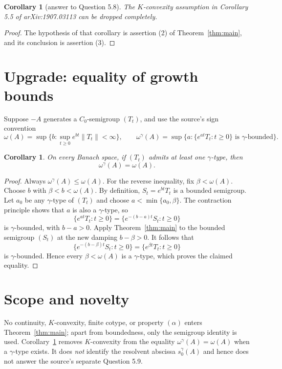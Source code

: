 \documentclass[11pt]{article}
\newtheorem{corollary}[theorem]{Corollary}
\begin{document}
\begin{corollary}[answer to Question 5.8]
The $K$-convexity assumption in Corollary 5.5 of arXiv:1907.03113 can be
dropped completely.
\end{corollary}

\begin{proof}
The hypothesis of that corollary is assertion (2) of
Theorem~\ref{thm:main}, and its conclusion is assertion (3).
\end{proof}

\section{Upgrade: equality of growth bounds}

Suppose $-A$ generates a $C_0$-semigroup $(T_t)$, and use the source's sign
convention
\[
 \omega(A)=\sup\{b:\sup_{t\geq0}e^{bt}\|T_t\|<\infty\},
 \qquad
 \omega^\gamma(A)=\sup\{a:\{e^{at}T_t:t\geq0\}
                              \text{ is $\gamma$-bounded}\}.
\]

\begin{corollary}\label{cor:growth}
On every Banach space, if $(T_t)$ admits at least one $\gamma$-type, then
\[
 \omega^\gamma(A)=\omega(A).
\]
\end{corollary}

\begin{proof}
Always $\omega^\gamma(A)\leq\omega(A)$.  For the reverse inequality, fix
$\beta<\omega(A)$.  Choose $b$ with $\beta<b<\omega(A)$.  By definition,
$S_t=e^{bt}T_t$ is a bounded semigroup.  Let $a_0$ be any $\gamma$-type of
$(T_t)$ and choose $a<\min\{a_0,\beta\}$.  The contraction principle shows
that $a$ is also a $\gamma$-type, so
\[
 \{e^{at}T_t:t\geq0\}
 =\{e^{-(b-a)t}S_t:t\geq0\}
\]
is $\gamma$-bounded, with $b-a>0$.  Apply Theorem~\ref{thm:main} to the
bounded semigroup $(S_t)$ at the new damping $b-\beta>0$.  It follows that
\[
 \{e^{-(b-\beta)t}S_t:t\geq0\}
 =\{e^{\beta t}T_t:t\geq0\}
\]
is $\gamma$-bounded.  Hence every $\beta<\omega(A)$ is a $\gamma$-type, which
proves the claimed equality.
\end{proof}

\section{Scope and novelty}

No continuity, $K$-convexity, finite cotype, or property $(\alpha)$ enters
Theorem~\ref{thm:main}; apart from boundedness, only the semigroup identity is
used.  Corollary~\ref{cor:growth} removes $K$-convexity from the equality
$\omega^\gamma(A)=\omega(A)$ when a $\gamma$-type exists.  It does
\emph{not} identify the resolvent abscissa $s_0^\gamma(A)$ and hence does not
answer the source's separate Question 5.9.
\end{document}
